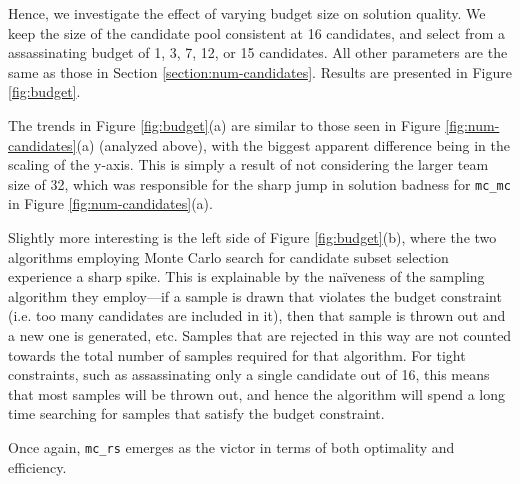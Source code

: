 Hence, we investigate the effect of varying budget size on solution quality.
We keep the size of the candidate pool consistent at 16 candidates, and select from a assassinating budget of 1, 3, 7, 12, or 15 candidates.
All other parameters are the same as those in Section \ref{section:num-candidates}.
Results are presented in Figure \ref{fig:budget}.

The trends in Figure \ref{fig:budget}(a) are similar to those seen in Figure \ref{fig:num-candidates}(a) (analyzed above), with the biggest apparent difference being in the scaling of the y-axis.
This is simply a result of not considering the larger team size of 32, which was responsible for the sharp jump in solution badness for \texttt{mc\_mc} in Figure \ref{fig:num-candidates}(a).

Slightly more interesting is the left side of Figure \ref{fig:budget}(b), where the two algorithms employing Monte Carlo search for candidate subset selection experience a sharp spike.
This is explainable by the na\"iveness of the sampling algorithm they employ---if a sample is drawn that violates the budget constraint (i.e. too many candidates are included in it), then that sample is thrown out and a new one is generated, etc.
Samples that are rejected in this way are not counted towards the total number of samples required for that algorithm.
For tight constraints, such as assassinating only a single candidate out of 16, this means that most samples will be thrown out, and hence the algorithm will spend a long time searching for samples that satisfy the budget constraint.

Once again, \texttt{mc\_rs} emerges as the victor in terms of both optimality and efficiency.
